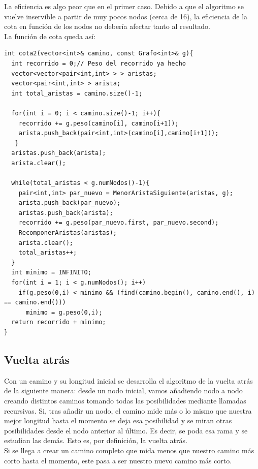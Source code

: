La eficiencia es algo peor que en el primer caso. Debido a que el algoritmo se vuelve inservible a partir de muy pocos nodos (cerca de 16), la eficiencia de la cota en función de los nodos no debería afectar tanto al resultado. %
\\

La función de cota queda así:
\begin{lstlisting}
int cota2(vector<int>& camino, const Grafo<int>& g){
  int recorrido = 0;// Peso del recorrido ya hecho
  vector<vector<pair<int,int> > > aristas;
  vector<pair<int,int> > arista;
  int total_aristas = camino.size()-1;

  for(int i = 0; i < camino.size()-1; i++){
    recorrido += g.peso(camino[i], camino[i+1]);
    arista.push_back(pair<int,int>(camino[i],camino[i+1]));
   }
  aristas.push_back(arista);
  arista.clear();

  while(total_aristas < g.numNodos()-1){
    pair<int,int> par_nuevo = MenorAristaSiguiente(aristas, g);
    arista.push_back(par_nuevo);
    aristas.push_back(arista);
    recorrido += g.peso(par_nuevo.first, par_nuevo.second);
    RecomponerAristas(aristas);
    arista.clear();
    total_aristas++;
  }
  int minimo = INFINITO;
  for(int i = 1; i < g.numNodos(); i++)
    if(g.peso(0,i) < minimo && (find(camino.begin(), camino.end(), i) == camino.end()))
      minimo = g.peso(0,i);
  return recorrido + minimo;
}
\end{lstlisting}

\subsection{Vuelta atrás}

Con un camino y su longitud inicial se desarrolla el algoritmo de la vuelta atrás de la siguiente manera: desde un nodo inicial, vamos añadiendo nodo a nodo creando distintos caminos tomando todas las posibilidades mediante llamadas recursivas. Si, tras añadir un nodo, el camino mide más o lo mismo que nuestra mejor longitud hasta el momento se deja esa posibilidad y se miran otras posibilidades desde el nodo anterior al último. Es decir, se poda esa rama y se estudian las demás. Esto es, por definición, la vuelta atrás. \\

Si se llega a crear un camino completo que mida menos que nuestro camino más corto hasta el momento, este pasa a ser nuestro nuevo camino más corto. \\

